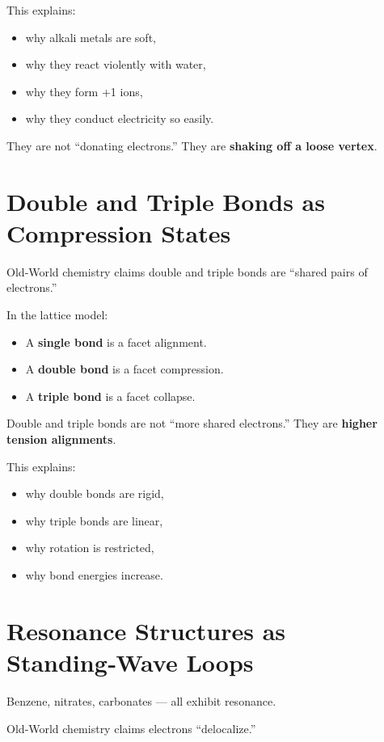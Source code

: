 \documentclass[11pt, letterpaper, openany]{book}
\begin{document}
This explains:

\begin{itemize}
    \item why alkali metals are soft,
    \item why they react violently with water,
    \item why they form +1 ions,
    \item why they conduct electricity so easily.
\end{itemize}

They are not “donating electrons.”  
They are \textbf{shaking off a loose vertex}.

\section{Double and Triple Bonds as Compression States}

Old‑World chemistry claims double and triple bonds are “shared pairs of electrons.”

In the lattice model:

\begin{itemize}
    \item A \textbf{single bond} is a facet alignment.
    \item A \textbf{double bond} is a facet compression.
    \item A \textbf{triple bond} is a facet collapse.
\end{itemize}

Double and triple bonds are not “more shared electrons.”  
They are \textbf{higher tension alignments}.

This explains:

\begin{itemize}
    \item why double bonds are rigid,
    \item why triple bonds are linear,
    \item why rotation is restricted,
    \item why bond energies increase.
\end{itemize}

\section{Resonance Structures as Standing‑Wave Loops}

Benzene, nitrates, carbonates — all exhibit resonance.

Old‑World chemistry claims electrons “delocalize.”
\end{document}
